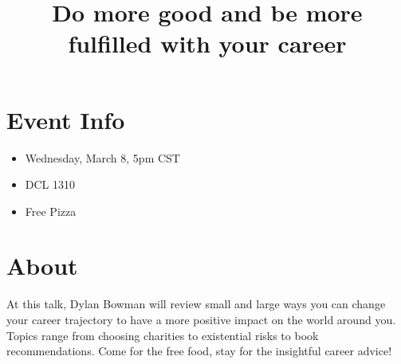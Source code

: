 \documentclass[a4paper]{article}
\date{}
\author{}
\title{Do more good and be more fulfilled with your career}
\begin{document}
\maketitle

\section{Event Info}

\begin{itemize}
    \item Wednesday, March 8, 5pm CST
    \item DCL 1310
    \item Free Pizza
\end{itemize}

\section{About}

At this talk, Dylan Bowman will review small and large ways you can
change your career trajectory to have a more positive impact on the
world around you. Topics range from choosing charities to existential
risks to book recommendations. Come for the free food, stay for the insightful
career advice!
\end{document}
